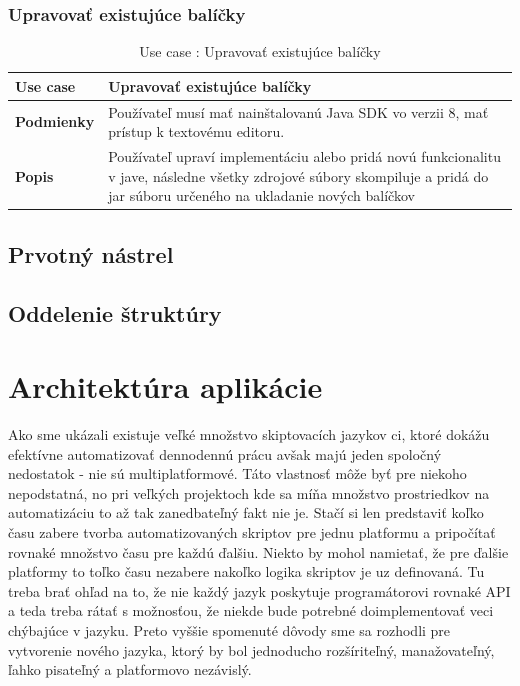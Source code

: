 \subsubsection{Upravovať existujúce balíčky}
\begin{center}
	\begin{table}[htbp]
		\begin{tabular}{|p{2.5cm}|p{14cm}|}
			\hline
			\textbf{Use case} & Upravovať existujúce balíčky \\ 
			\hline
			\textbf{Podmienky} &  Používateľ musí mať nainštalovanú Java SDK vo verzii 8, mať prístup k textovému editoru.  \\ 
			\hline
			\textbf{Popis} & Používateľ upraví implementáciu alebo pridá novú funkcionalitu v jave, následne všetky zdrojové súbory skompiluje a pridá do jar súboru určeného na ukladanie nových balíčkov\\ 
			\hline
		\end{tabular}
		\label{table:1}
		\caption{Use case : Upravovať existujúce balíčky}
	\end{table}
\end{center}

\subsection{Prvotný nástrel}
\subsection{Oddelenie štruktúry}

\section{Architektúra aplikácie}
\indent Ako sme ukázali existuje veľké množstvo skiptovacích jazykov ci, ktoré dokážu efektívne automatizovať dennodennú prácu avšak majú jeden spoločný nedostatok - nie sú multiplatformové. Táto vlastnosť môže byť  pre niekoho nepodstatná, no pri veľkých projektoch kde sa míňa množstvo prostriedkov na automatizáciu to až tak zanedbateľný fakt nie je. Stačí si len predstaviť koľko času zabere tvorba automatizovaných skriptov pre jednu platformu a pripočítať rovnaké množstvo času pre každú ďalšiu. Niekto by mohol namietať, že pre ďalšie platformy to toľko času nezabere nakoľko logika skriptov je uz definovaná. Tu treba brať ohľad na to, že nie každý jazyk poskytuje programátorovi rovnaké API a teda treba rátať s možnosťou, že niekde bude potrebné doimplementovať veci chýbajúce v jazyku. Preto vyššie spomenuté dôvody sme sa rozhodli pre vytvorenie nového jazyka, ktorý by bol jednoducho rozšíriteľný, manažovateľný, ľahko pisateľný a platformovo nezávislý.


